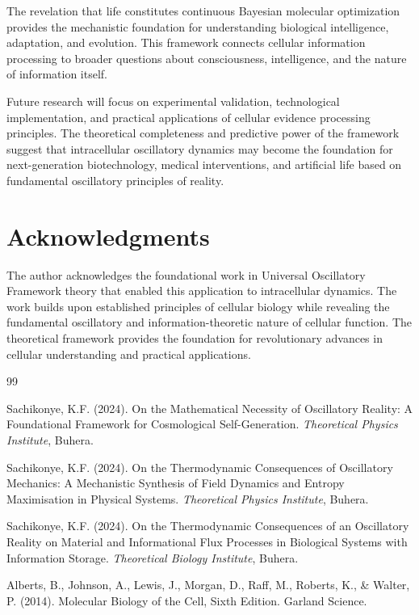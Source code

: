 \documentclass[12pt,a4paper]{article}
\begin{document}
{The revelation that life constitutes continuous Bayesian molecular optimization provides the mechanistic foundation for understanding biological intelligence, adaptation, and evolution. This framework connects cellular information processing to broader questions about consciousness, intelligence, and the nature of information itself.

Future research will focus on experimental validation, technological implementation, and practical applications of cellular evidence processing principles. The theoretical completeness and predictive power of the framework suggest that intracellular oscillatory dynamics may become the foundation for next-generation biotechnology, medical interventions, and artificial life based on fundamental oscillatory principles of reality.

\section{Acknowledgments}

The author acknowledges the foundational work in Universal Oscillatory Framework theory that enabled this application to intracellular dynamics. The work builds upon established principles of cellular biology while revealing the fundamental oscillatory and information-theoretic nature of cellular function. The theoretical framework provides the foundation for revolutionary advances in cellular understanding and practical applications.

\begin{thebibliography}{99}

Sachikonye, K.F. (2024). On the Mathematical Necessity of Oscillatory Reality: A Foundational Framework for Cosmological Self-Generation. \textit{Theoretical Physics Institute}, Buhera.

Sachikonye, K.F. (2024). On the Thermodynamic Consequences of Oscillatory Mechanics: A Mechanistic Synthesis of Field Dynamics and Entropy Maximisation in Physical Systems. \textit{Theoretical Physics Institute}, Buhera.

Sachikonye, K.F. (2024). On the Thermodynamic Consequences of an Oscillatory Reality on Material and Informational Flux Processes in Biological Systems with Information Storage. \textit{Theoretical Biology Institute}, Buhera.

Alberts, B., Johnson, A., Lewis, J., Morgan, D., Raff, M., Roberts, K., \& Walter, P. (2014). Molecular Biology of the Cell, Sixth Edition. Garland Science.


\end{thebibliography}}
\end{document}

